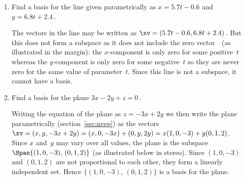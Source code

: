 \begin{example}
\begin{enumerate}
\item Find a basis for the line given parametrically as \(x=5.7t-0.6\) and \(y=6.8t+2.4\)\,.
\begin{solution} 
The vectors in the line may be written as \(\xv=(5.7t-0.6,6.8t+2.4)\)\,.
But this does not form a subspace as it does not include the zero vector~\ov\ (as illustrated in the margin): 
the \(x\)-component is only zero for some positive~\(t\) whereas the \(y\)-component is only zero for some negative~\(t\) so they are never zero for the same value of parameter~\(t\).
Since this line is not a subspace, it cannot have a basis.
\end{solution}




\item Find a basis for the plane \(3x-2y+z=0\)\,.
\begin{solution} 
Writing the equation of the plane as \(z=-3x+2y\) we then write the plane parametrically (section~\ref{sec:nvep}) as the vectors \(\xv=(x,y,-3x+2y) =(x,0,-3x)+(0,y,2y) =x(1,0,-3) +y(0,1,2)\).
Since \(x\) and~\(y\) may vary over all values, the plane is the subspace \(\Span\{(1,0,-3),\,(0,1,2)\}\) (as illustrated below in stereo).
Since \((1,0,-3)\) and \((0,1,2)\) are not proportional to each other, they form a linearly independent set.
Hence \(\{(1,0,-3),\,(0,1,2)\}\) is a basis for the plane.
\begin{center}
 {}
\end{center}
\end{solution}





\end{enumerate}
\end{example}
